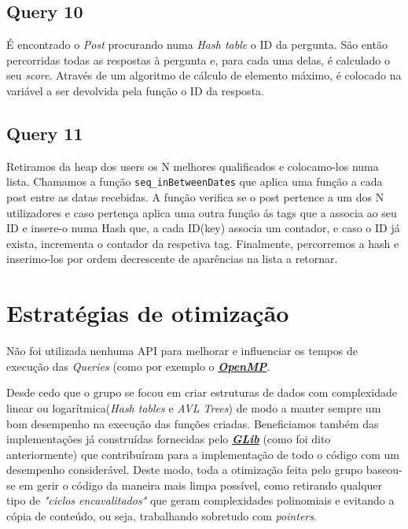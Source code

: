 \documentclass[a4paper]{report}
\begin{document}
	\section{Query 10}
	\tab É encontrado o \textit{Post} procurando numa \textit{Hash table} o ID da pergunta. São então percorridas todas as respostas à pergunta e, para cada uma delas, é calculado o seu \textit{score}. Através de um algoritmo de cálculo de elemento máximo, é colocado na variável a ser devolvida pela função o ID da resposta.
 
	\section{Query 11}
	\tab Retiramos da heap dos users os N melhores qualificados e colocamo-los numa lista. Chamamos a função \verb+seq_inBetweenDates+  que aplica uma função a cada post entre as datas recebidas. A função verifica se o post pertence a um dos N utilizadores e caso pertença aplica uma outra função ás tags que a associa ao seu ID e insere-o numa Hash que, a cada ID(key) associa um contador, e caso o ID já exista, incrementa o contador da respetiva tag. Finalmente, percorremos a hash e inserimo-los por ordem decrescente de aparências na lista a retornar.

\chapter{Estratégias de otimização}
	\tab Não foi utilizada nenhuma API para melhorar e influenciar os tempos de execução das \textit{Queries} (como por exemplo o \href{http://www.openmp.org/}{\textit{\textbf{OpenMP}}}. \par
	Desde cedo que o grupo se focou em criar estruturas de dados com complexidade linear ou logarítmica(\textit{Hash tables} e \textit{AVL Trees}) de modo a manter sempre um bom desempenho na execução das funções criadas. Beneficiamos também das implementações já construídas fornecidas pelo \href{https://developer.gnome.org/glib/}{\textit{\textbf{GLib}}} (como foi dito anteriormente) que contribuíram para a implementação de todo o código com um desempenho considerável.
	Deste modo, toda a otimização feita pelo grupo baseou-se em gerir o código da maneira mais limpa possível, como retirando qualquer tipo de \textit{"ciclos encavalitados"} que geram complexidades polinomiais e evitando a cópia de conteúdo, ou seja, trabalhando sobretudo com \textit{pointers}.
\end{document}
